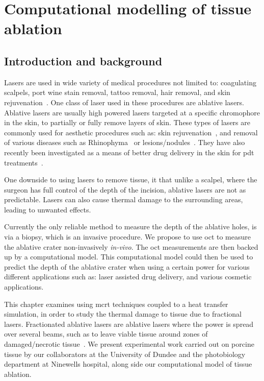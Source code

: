\chapter{Computational modelling of tissue ablation}
\label{chap:ablation}
\section{Introduction and background}
Lasers are used in wide variety of medical procedures not limited to: coagulating scalpels, port wine stain removal, tattoo removal, hair removal, and skin rejuvenation~\cite{amini2010ultrafast, tan1989treatment,kuperman2001laser,liew2002laser,hardaway2002nonablative}.
One class of laser used in these procedures are ablative lasers. Ablative lasers are usually high powered lasers targeted at a specific chromophore in the skin, to partially or fully remove layers of skin. These types of lasers are commonly used for aesthetic procedures such as: skin rejuvenation~\cite{hardaway2002nonablative}, and removal of various diseases such as Rhinophyma~\cite{shapshay1980removal} or lesions/nodules~\cite{valcavi2010percutaneous}. They have also recently been investigated as a means of better drug delivery in the skin for \gls{pdt} treatments~\cite{haedersdal2010fractional}.

One downside to using lasers to remove tissue, it that unlike a scalpel, where the surgeon has full control of the depth of the incision, ablative lasers are not as predictable. Lasers can also cause  thermal damage to the surrounding areas, leading to unwanted effects.

 Currently the only reliable method to measure the depth of the ablative holes, is via a biopsy, which is an invasive procedure. We propose to use \gls{oct} to measure the ablative crater non-invasively \textit{in-vivo}. The \gls{oct} measurements are then backed up by a computational model. This computational model could then be used to predict the depth of the ablative crater when using a certain power for various different applications such as: laser assisted drug delivery, and various cosmetic applications.

This chapter examines using \gls{mcrt} techniques coupled to a heat transfer simulation, in order to study the thermal damage to tissue due to fractional lasers. Fractionated ablative lasers  are ablative lasers where the power is spread over several beams, such as to leave viable tissue around zones of damaged/necrotic tissue~\cite{manstein2004fractional}. We present experimental work carried out on porcine tissue by our collaborators at the University of Dundee and the photobiology department at Ninewells hospital, along side our computational model of tissue ablation.

